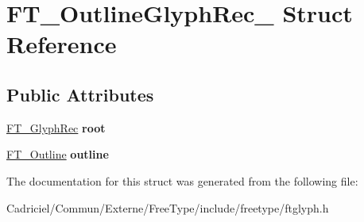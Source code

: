 \hypertarget{struct_f_t___outline_glyph_rec__}{}\section{F\+T\+\_\+\+Outline\+Glyph\+Rec\+\_\+ Struct Reference}
\label{struct_f_t___outline_glyph_rec__}
\subsection*{Public Attributes}
\begin{DoxyCompactItemize}
\item 
\hyperlink{struct_f_t___glyph_rec__}{F\+T\+\_\+\+Glyph\+Rec} {\bfseries root}\hypertarget{struct_f_t___outline_glyph_rec___a71e5a8d5fe69e0cea68c96486dd6713f}{}\label{struct_f_t___outline_glyph_rec___a71e5a8d5fe69e0cea68c96486dd6713f}

\item 
\hyperlink{struct_f_t___outline__}{F\+T\+\_\+\+Outline} {\bfseries outline}\hypertarget{struct_f_t___outline_glyph_rec___af1bd473a32fcbc500edcfcf89e3ac8ac}{}\label{struct_f_t___outline_glyph_rec___af1bd473a32fcbc500edcfcf89e3ac8ac}

\end{DoxyCompactItemize}


The documentation for this struct was generated from the following file\+:\begin{DoxyCompactItemize}
\item 
Cadriciel/\+Commun/\+Externe/\+Free\+Type/include/freetype/ftglyph.\+h\end{DoxyCompactItemize}
